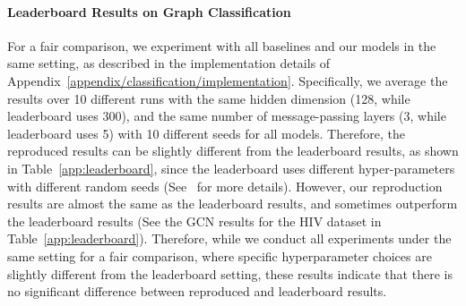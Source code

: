 \paragraph{Leaderboard Results on Graph Classification}
For a fair comparison, we experiment with all baselines and our models in the same setting, as described in the implementation details of Appendix~\ref{appendix/classification/implementation}. Specifically, we average the results over 10 different runs with the same hidden dimension (128, while leaderboard uses 300), and the same number of message-passing layers (3, while leaderboard uses 5) with 10 different seeds for all models. Therefore, the reproduced results can be slightly different from the leaderboard results, as shown in Table~\ref{app:leaderboard}, since the leaderboard uses different hyper-parameters with different random seeds (See~\cite{OGB} for more details). However, our reproduction results are almost the same as the leaderboard results, and sometimes outperform the leaderboard results (See the GCN results for the HIV dataset in Table~\ref{app:leaderboard}). Therefore, while we conduct all experiments under the same setting for a fair comparison, where specific hyperparameter choices are slightly different from the leaderboard setting, these results indicate that there is no significant difference between reproduced and leaderboard results.


